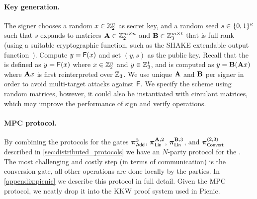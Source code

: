 \paragraph{Key generation.}
The signer chooses a random $x \in \mathbb{Z}_2^n$ as 
secret key, and a random seed $s \in \{0,1\}^{\kappa}$ such that $s$
expands to matrices $\mathbf{A} \in \mathbb{Z}_2^{m\times n}$ and $\mathbf{B}\in \mathbb{Z}_3^{m\times t}$ that is full rank (using a suitable cryptographic
function, such as the SHAKE extendable output function~\cite{sp800-185}).
Compute $y = \mathsf{F}(x)$ and set $(y, s)$ as the public key.
Recall that the \ttOWF is defined as $y = \mathsf{F}(x)$ where $x \in \mathbb{Z}_2^{n}$ and $y\in \mathbb{Z}_3^{t}$, and is computed as $y = \mat{B}(\mat{A}x)$ where $\mat{A}x$ is first reinterpreted over $\mathbb{Z}_3$. 
We use unique $\mathbf{A}$ and $\mathbf{B}$ per signer in order to avoid multi-target attacks against $\mathsf{F}$.
We specify the scheme using random matrices, however, it could also be instantiated
with circulant matrices, which may improve the performance of sign and verify operations.

\paragraph{MPC protocol.}
By combining the protocols for the gates 
$\boldsymbol{\pi}_{\textnormal{\textsf{Add}}}^{3}$,
$\prot_{\LMap}^{\mat{A},2}$,
$\prot_{\LMap}^{\mat{B},3}$, and
$\boldsymbol{\pi}_{\textnormal{\textsf{Convert}}}^{(2,3)}$
described in \cref{sec:distributed_protocols} we have an $N$-party protocol for
the \ttOWF. The most challenging and costly step (in terms of communication) is
the conversion gate, all other operations are done locally by the parties.  In
\cref{appendix:picnic} we describe this protocol in full detail.  Given the MPC
protocol, we neatly drop it into the KKW proof system used in Picnic.  

